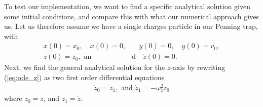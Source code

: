 To test our implementation, we want to find a specific analytical solution given some initial conditions, and compare this with what our numerical approach gives us. Let us therefore assume we have a single charges particle in our Penning trap, with
%
\begin{align*}
x(0) = x_0, \quad \dot x(0) = 0, &\quad y(0) = 0, \quad \dot y(0) = v_0, \\
z(0) = z_0, \text{ an}&\text{d} \quad \dot z(0) = 0.
\end{align*}
%
Next, we find the general analytical solution for the $z$-axis by rewriting (\ref{eq:ode_z}) as two first order differential equations
%
\begin{align}
\dot z_0 = z_1, \text{ and } \dot z_1 = - \omega_z^2 z_0
\label{eq:ode_z_coupled}
\end{align}
%
where $z_0 = z$, and $z_1 = \dot z$. 
